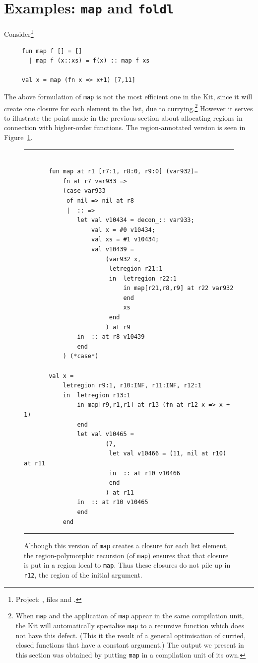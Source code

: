 \documentclass[12pt]{book}
\begin{document}
\section{Examples: {\tt map} and {\tt foldl}}
Consider\footnote{Project: ,
files  and .}
\begin{verbatim}
     fun map f [] = []
       | map f (x::xs) = f(x) :: map f xs
    
     val x = map (fn x => x+1) [7,11]
\end{verbatim}
The above formulation of {\tt map} is not the most efficient one in the Kit, 
since it will create one closure for each element in the list, due
to currying.\footnote{When {\tt map} and
the application of {\tt map} appear in the same compilation unit, 
the Kit will automatically specialise {\tt map}
to a recursive function which does not have this defect. 
(This it the result of a general optimisation of curried, closed functions
that have a constant argument.)
The output we present in this section was obtained
by putting {\tt map} in a compilation unit of its own.} However it serves to
illustrate the point made in the previous section about allocating regions in 
connection with higher-order functions. The region-annotated version is seen
in Figure~\ref{lam3.fig}.
\begin{figure}
\hrule
\begin{verbatim}

       fun map at r1 [r7:1, r8:0, r9:0] (var932)= 
           fn at r7 var933 => 
           (case var933 
            of nil => nil at r8
            |  :: => 
               let val v10434 = decon_:: var933; 
                   val x = #0 v10434; 
                   val xs = #1 v10434; 
                   val v10439 = 
                       (var932 x, 
                        letregion r21:1 
                        in  letregion r22:1 
                            in map[r21,r8,r9] at r22 var932 
                            end
                            xs 
                        end
                       ) at r9
               in  :: at r8 v10439
               end 
           ) (*case*) 

       val x = 
           letregion r9:1, r10:INF, r11:INF, r12:1 
           in  letregion r13:1 
               in map[r9,r1,r1] at r13 (fn at r12 x => x + 1) 
               end
               let val v10465 = 
                       (7, 
                        let val v10466 = (11, nil at r10) at r11
                        in  :: at r10 v10466
                        end 
                       ) at r11
               in  :: at r10 v10465
               end  
           end
\end{verbatim}
\caption{Although this version of {\tt map} creates a closure for
  each list element, the region-polymorphic recursion (of {\tt map})
  ensures that that closure is put in a region local to {\tt map}.
  Thus these closures do not pile up in {\tt r12}, the region of the
  initial argument.} 
\medskip \hrule
\label{lam3.fig}
\end{figure}
\end{document}
